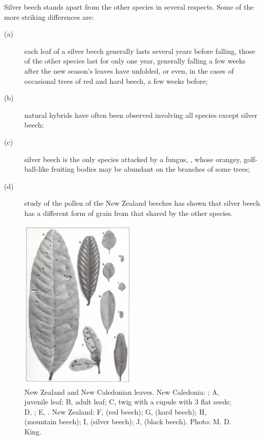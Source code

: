 Silver beech stands apart from the other species in several respects.
Some of the more striking differences are:

\begin{description}
\item[{(a)}]each leaf of a silver beech generally lasts several years before falling, those of the other species last for only one year, generally falling a few weeks after the new season's leaves have unfolded, or even, in the cases of occasional trees of red and hard beech, a few weeks before;
\item[{(b)}]natural hybrids have often been observed involving all species except silver beech;
\item[{(c)}]silver beech is the only species attacked by a fungus, , whose orangey, golf-ball-like fruiting bodies may be abundant on the branches of some trees;
\item[{(d)}]study of the pollen of the New Zealand beeches has shown that silver beech has a different form of grain from that shared by the other species.
\end{description}

\begin{figure}
	\includegraphics[width=0.5\textwidth]{graphics/figure70nothofagus.jpg}
	\centering
	\caption[New Zealand and New Caledonian Nothofagus leaves]{New Zealand and New Caledonian  leaves.
New Caledonia: ; A, juvenile leaf; B, adult leaf; C, twig with a cupule with 3 flat seeds; D, ; E, .
New Zealand: F,  (red beech); G,  (hard beech); H,  (mountain beech); I,  (silver beech); J,  (black beech).
	Photo: M. D. King.}%
	\label{fig:70nothofagus}
\end{figure}

